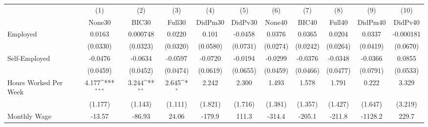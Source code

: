 {
\def\sym#1{\ifmmode^{#1}\else\(^{#1}\)\fi}
\begin{tabular}{l*{10}{c}}
\toprule
            &\multicolumn{1}{c}{(1)}&\multicolumn{1}{c}{(2)}&\multicolumn{1}{c}{(3)}&\multicolumn{1}{c}{(4)}&\multicolumn{1}{c}{(5)}&\multicolumn{1}{c}{(6)}&\multicolumn{1}{c}{(7)}&\multicolumn{1}{c}{(8)}&\multicolumn{1}{c}{(9)}&\multicolumn{1}{c}{(10)}\\
            &\multicolumn{1}{c}{None30}&\multicolumn{1}{c}{BIC30}&\multicolumn{1}{c}{Full30}&\multicolumn{1}{c}{DidPm30}&\multicolumn{1}{c}{DidPv30}&\multicolumn{1}{c}{None40}&\multicolumn{1}{c}{BIC40}&\multicolumn{1}{c}{Full40}&\multicolumn{1}{c}{DidPm40}&\multicolumn{1}{c}{DidPv40}\\
\midrule
Employed    &      0.0163         &    0.000748         &      0.0220         &       0.101         &     -0.0458         &      0.0376         &      0.0365         &      0.0204         &      0.0337         &   -0.000181         \\
            &    (0.0330)         &    (0.0323)         &    (0.0320)         &    (0.0580)         &    (0.0731)         &    (0.0274)         &    (0.0242)         &    (0.0264)         &    (0.0419)         &    (0.0670)         \\
\addlinespace
Self-Employed&     -0.0476         &     -0.0634         &     -0.0597         &     -0.0720         &     -0.0194         &     -0.0299         &     -0.0376         &     -0.0348         &     -0.0366         &      0.0855         \\
            &    (0.0459)         &    (0.0452)         &    (0.0474)         &    (0.0619)         &    (0.0655)         &    (0.0459)         &    (0.0466)         &    (0.0477)         &    (0.0791)         &    (0.0533)         \\
\addlinespace
Hours Worked Per Week&       4.177\sym{***}&       3.244\sym{**} &       2.645\sym{*}  &       2.242         &       2.300         &       1.493         &       1.578         &       1.791         &       0.222         &       3.329         \\
            &     (1.177)         &     (1.143)         &     (1.111)         &     (1.821)         &     (1.716)         &     (1.381)         &     (1.357)         &     (1.427)         &     (1.647)         &     (3.219)         \\
\addlinespace
Monthly Wage&      -13.57         &      -86.93         &       24.06         &      -179.9         &       111.3         &      -314.4         &      -205.1         &      -211.8         &     -1128.2         &       229.7         \\

\end{tabular}}
